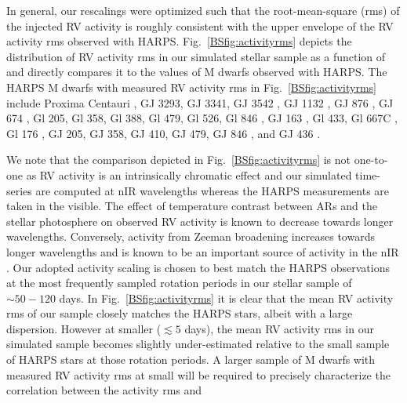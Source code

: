 In general, our rescalings were optimized such that the root-mean-square (rms) of the injected RV activity is
roughly consistent with the upper envelope of the RV activity rms observed with HARPS.
Fig.~\ref{BSfig:activityrms} depicts the distribution of RV activity rms in our simulated stellar
sample as a function of \prot{} and directly compares it to the values of M dwarfs observed with HARPS.
The HARPS M dwarfs with measured RV activity rms in Fig.~\ref{BSfig:activityrms} include
Proxima Centauri \citep{angladaescude16},
GJ 3293, GJ 3341, GJ 3542 \citep{astudillodefru15},
GJ 1132 \citep{berta15}, 
GJ 876 \citep{correia10},
GJ 674 \citep{bonfils07},
Gl 205, Gl 358, Gl 388, Gl 479, Gl 526, Gl 846 \citep{bonfils13},
GJ 163 \citep{bonfils13b},
Gl 433, Gl 667C \citep{delfosse13b},
Gl 176 \citep{forveille09},
GJ 205, GJ 358, GJ 410, GJ 479, GJ 846 \citep{hebrard16},
and GJ 436 \citep{lanotte14}. 

We note that the comparison depicted in Fig.~\ref{BSfig:activityrms}
is not one-to-one as RV activity is an intrinsically chromatic effect and our
simulated time-series are computed at nIR wavelengths whereas the HARPS measurements are taken in the
visible. The effect of temperature contrast between ARs and the stellar photosphere on observed RV activity
is known to decrease towards longer wavelengths. Conversely, activity from Zeeman broadening increases towards
longer wavelengths and is known to be an important source of activity in the nIR \citep{hebrard14,moutou17}.
Our adopted activity scaling is chosen to best match the HARPS observations at the most frequently sampled rotation periods
in our stellar sample of $\sim 50-120$ days. In Fig.~\ref{BSfig:activityrms} it is clear that the mean RV activity rms
of our sample closely matches the HARPS stars, albeit with a large dispersion.
However at smaller \prot{} ($\lesssim 5$ days),
the mean RV activity rms in our simulated sample becomes slightly under-estimated relative to
the small sample of HARPS stars at those rotation periods. A larger sample of M dwarfs with measured RV activity rms at 
small \prot{} will be required to precisely characterize the correlation between the activity rms and

